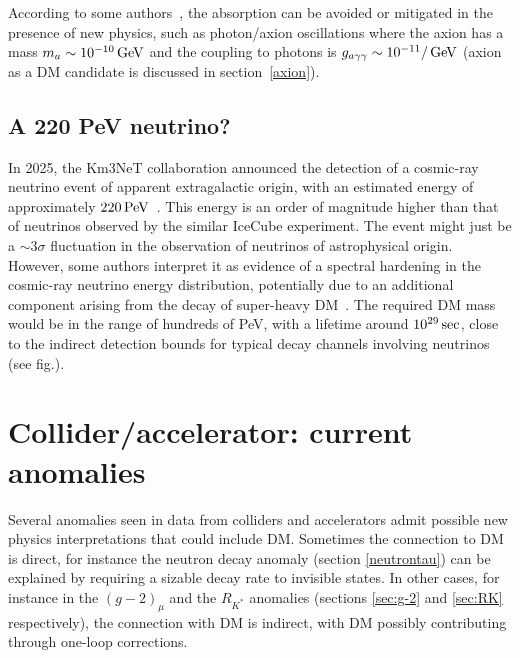 According to some authors~\cite{GRBanomaly}, the absorption can be avoided or mitigated in the presence of new physics,
such as photon/axion oscillations where the axion has a mass $m_a\sim 10^{-10}\,{\rm GeV}$ and
the coupling to photons is $g_{a\gamma\gamma}\sim 10^{-11}/\,{\rm GeV}$ (axion as a DM candidate is discussed in 
section~\ref{axion}).

\subsection{A 220 PeV neutrino?}\label{sec:220PeVanomaly}
In 2025, the {\sc Km3NeT} collaboration announced the detection of a cosmic-ray neutrino event of apparent extragalactic origin, 
with an estimated energy of approximately  $220 \,{\rm PeV}$~\cite{220PeVanomaly}. 
This energy is an order of magnitude higher than that of neutrinos observed by the similar {\sc IceCube} experiment. 
The event might just be a $\sim 3\sigma$ fluctuation in the observation of neutrinos of astrophysical origin.
However, some authors interpret it as evidence of a spectral hardening in the cosmic-ray neutrino energy distribution, 
potentially due to an additional component arising from the decay of super-heavy DM~\cite{220PeVanomaly}.
The required DM mass would be in the range of hundreds of PeV, with a lifetime around  $10^{29}\,{\rm sec}$,
close to the indirect detection bounds for typical decay channels involving neutrinos (see fig.).




\section{Collider/accelerator: current anomalies}
Several anomalies seen in data from colliders and accelerators admit possible new physics interpretations that could include
DM. Sometimes the connection to DM is direct, for instance the neutron decay anomaly (section \ref{neutrontau}) can be explained by requiring a sizable decay rate to invisible states. In other cases, for instance in the $(g-2)_\mu$ and the $R_{K^*}$ anomalies (sections \ref{sec:g-2} and \ref{sec:RK} respectively), the connection with DM is indirect, with DM possibly contributing through one-loop corrections.  



